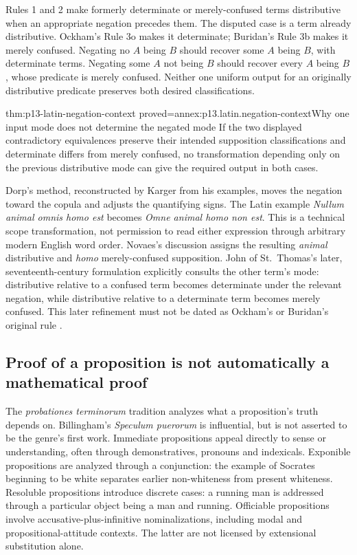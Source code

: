 Rules 1 and 2 make formerly determinate or merely-confused terms distributive
when an appropriate negation precedes them. The disputed case is a term
already distributive. Ockham's Rule 3o makes it determinate; Buridan's
Rule 3b makes it merely confused.
Negating no \(A\) being \(B\) should recover some \(A\) being \(B\),
with determinate terms. Negating some \(A\) not being \(B\) should recover
every \(A\) being \(B\), whose predicate is merely confused.
Neither one uniform output for an originally distributive predicate
preserves both desired classifications.

\begin{hblemma}{thm:p13-latin-negation-context}
 {proved=annex:p13.latin.negation-context}{Why one input mode does not determine the negated mode}
If the two displayed contradictory equivalences preserve their intended
supposition classifications and determinate differs from merely confused,
no transformation depending only on the previous distributive mode can
give the required output in both cases.
\end{hblemma}

Dorp's method, reconstructed by Karger from his examples, moves the negation
toward the copula and adjusts the quantifying signs. The Latin example
\emph{Nullum animal omnis homo est} becomes
\emph{Omne animal homo non est}. This is a technical scope transformation,
not permission to read either expression through arbitrary modern English
word order. Novaes's discussion assigns the resulting \emph{animal}
distributive and \emph{homo} merely-confused supposition.
John of St.~Thomas's later, seventeenth-century formulation explicitly
consults the other term's mode: distributive relative to a confused
term becomes determinate under the relevant negation, while distributive
relative to a determinate term becomes merely confused.
This later refinement must not be dated as Ockham's or Buridan's original
rule \cite[pp.~461--465]{DutilhNovaes2007FordhamChapter8}.

\subsection{Proof of a proposition is not automatically a mathematical proof}

The \emph{probationes terminorum} tradition analyzes what a proposition's
truth depends on. Billingham's \emph{Speculum puerorum} is influential,
but is not asserted to be the genre's first work.
Immediate propositions appeal directly to sense or understanding,
often through demonstratives, pronouns and indexicals.
Exponible propositions are analyzed through a conjunction: the example
of Socrates beginning to be white separates earlier non-whiteness from
present whiteness. Resoluble propositions introduce discrete cases:
a running man is addressed through a particular object being a man
and running. Officiable propositions involve accusative-plus-infinitive
nominalizations, including modal and propositional-attitude contexts.
The latter are not licensed by extensional substitution alone.

